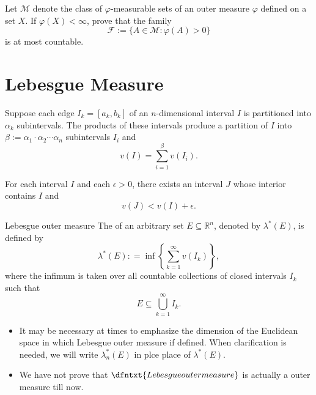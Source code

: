 \documentclass[../main.tex]{subfiles}
\begin{document}
\begin{exercise}{}{}
Let $\mathcal{M}$ denote the class of $\varphi$-measurable sets of an outer measure $\varphi$ defined on a set $X$. If $\varphi(X) < \infty$, prove that the family
\[
\mathcal{F} := \{A \in \mathcal{M} : \varphi(A) > 0\}
\]
is at most countable.
\end{exercise}


\section{Lebesgue Measure}

\begin{theorem}{}{}
Suppose each edge $I_k = [a_k, b_k]$ of an $n$-dimensional interval $I$ is partitioned into $\alpha_k$ subintervals. The products of these intervals produce a partition of $I$ into $\beta := \alpha_1 \cdot \alpha_2 \cdots \alpha_n$ subintervals $I_i$ and
\[
v(I) = \sum_{i=1}^{\beta} v(I_i).
\]
\end{theorem}


\begin{theorem}{}{}
For each interval $I$ and each $\epsilon > 0$, there exists an interval $J$ whose interior contains $I$ and
\[
v(J) < v(I) + \epsilon.
\]
\end{theorem}


\begin{definition}{Lebesgue outer measure}{}
    The  of an arbitrary set \(  E\subseteq \mathbb{R} ^{n}  \), denoted by \(   \lambda ^{*}\left( E \right)   \), is defined by \[
     \lambda ^{*}\left( E \right): = \inf \left\{ \sum _{k= 1}^{\infty}v\left( I _{k} \right)  \right\}, 
    \] where the infimum is taken over all countable collections of closed intervals \(  I _{k}  \) such that \[
    E\subseteq \bigcup _{k = 1}^{\infty}I _{k}. 
    \]  
\end{definition}

\begin{remark}
   \begin{itemize}
    \item  It may be necessary at times to emphasize the dimension of the Euclidean space in which Lebesgue outer measure if defined. When clarification is needed, we will write \(   \lambda _{n}^{*}\left( E \right)   \) in plce place of \(   \lambda ^{*}\left( E \right)   \).   
    \item We have not prove that \(  \dfntxt{Lebesgue outer measure}  \) is actually a outer measure till now. 
   \end{itemize}
   
\end{remark}
\end{document}
